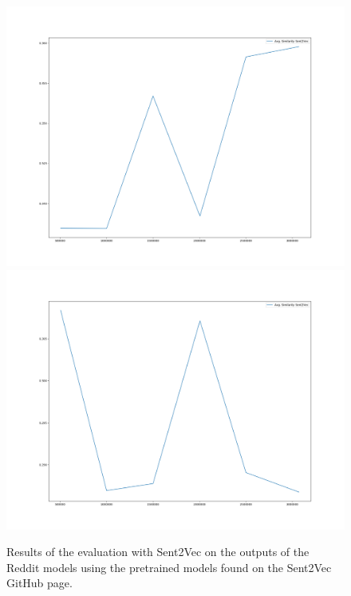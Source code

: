 \begin{figure}[H]
	\includegraphics[width=\linewidth]{img/plots/reddit/s2v_wiki_cosine_similarity.png}
	\centering
	\small
	\endminipage\hfill
	\includegraphics[width=\linewidth]{img/plots/reddit/s2v_twitter_cosine_similarity.png}
	\centering
	\small
	\endminipage\hfill
	\caption{Results of the evaluation with Sent2Vec on the outputs of the Reddit models using the pretrained models found on the Sent2Vec GitHub page.}
	\label{results:sent2vec:reddit:results}
\end{figure}

